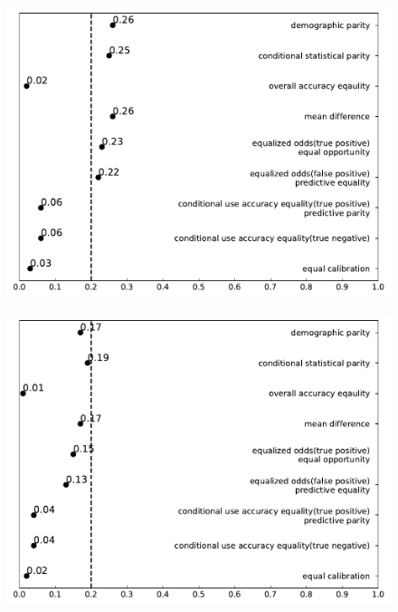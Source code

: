 \documentclass[conference]{IEEEtran}
\begin{document}
\begin{figure}[h]
    \centering
    \begin{minipage}[b]{0.48\linewidth}
        \centering
        \includegraphics[width=\linewidth]{African-American}
        \label{fig:1}
    \end{minipage}
    \hfill
    \begin{minipage}[b]{0.48\linewidth}
        \centering
        \includegraphics[width=\linewidth]{Caucasian}
        \label{fig:2}
    \end{minipage}
    \hfill
    \begin{minipage}[b]{0.48\linewidth}

\end{minipage}
\end{figure}
\end{document}
